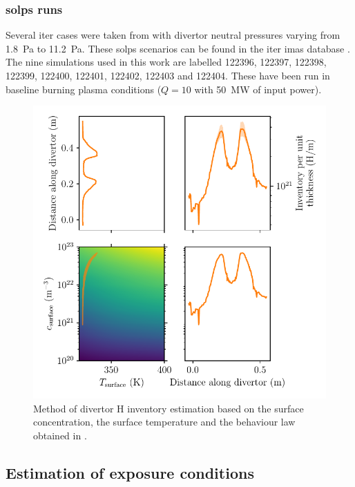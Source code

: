 \subsubsection{\gls{solps} runs}
Several \gls{iter} cases were taken from  with \gls{divertor} neutral pressures varying from \SI{1.8}{Pa} to \SI{11.2}{Pa}.
These \gls{solps}  scenarios can be found in the \gls{iter} \gls{imas} database .
The nine simulations used in this work are labelled 122396, 122397, 122398, 122399, 122400, 122401, 122402, 122403 and 122404.
These have been run in baseline burning plasma conditions ($Q=10$ with \SI{50}{MW} of input power).


\begin{figure}[h!]
    \centering
    \includegraphics[width=\linewidth]{Figures/Chapter4/example.pdf}
    \caption{Method of \gls{divertor} \gls{H} \gls{inventory} estimation based on the surface concentration, the surface temperature and the behaviour law obtained in .}
\end{figure}

\subsection{Estimation of exposure conditions}

